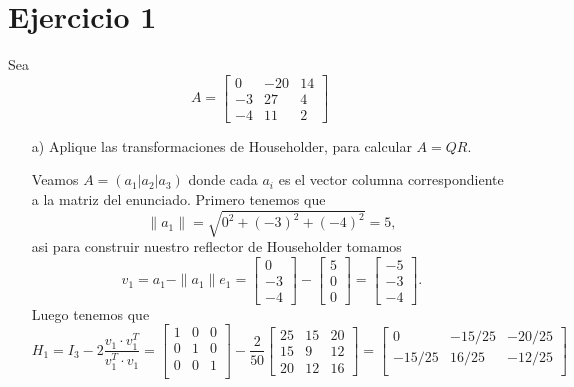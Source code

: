 
\section*{Ejercicio 1}
Sea
\[
A = \begin{bmatrix} 0 & -20 & 14 \\ -3 & 27 & 4 \\ -4 & 11 & 2 \end{bmatrix}
\]
\begin{enumerate}
    \item[a)] Aplique las transformaciones de Householder, para calcular $A = QR$.
    \begin{solution}
        Veamos $A=(a_1|a_2|a_3)$ donde cada $a_i$ es el vector columna correspondiente a la matriz del enunciado. Primero tenemos que
        $$\|a_1\|=\sqrt{0^2+(-3)^2+(-4)^2}=5,$$ 
        asi para construir nuestro reflector de Householder tomamos
        $$v_1=a_1-\|a_1\|e_1=\begin{bmatrix}
            0\\-3\\-4
        \end{bmatrix}-\begin{bmatrix}
                5\\ 0\\0
            \end{bmatrix}=\begin{bmatrix}
                -5\\-3\\-4
            \end{bmatrix}.$$
            Luego tenemos que
            $$H_1=I_3-2\frac{v_1\cdot v_1^T}{v_1^T\cdot v_1}=\begin{bmatrix}
                1&0&0\\
                0&1&0\\
                0&0&1\\
            \end{bmatrix}-\frac{2}{50}\begin{bmatrix}
                25&15&20\\
                15&9&12\\
                20&12&16 
            \end{bmatrix}=\begin{bmatrix}
                0&-15/25&-20/25\\
                -15/25&16/25&-12/25\\

\end{bmatrix}$$
\end{solution}
\end{enumerate}

